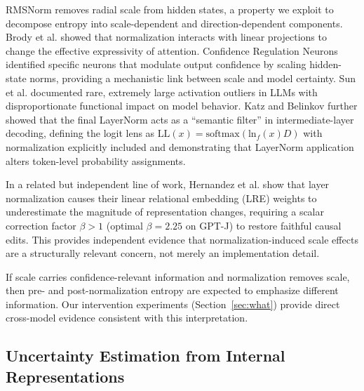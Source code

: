 \documentclass{ieeeaccess}
\begin{document}
RMSNorm \cite{zhang2019rmsnorm} removes radial scale from hidden states, a property we exploit to decompose entropy into scale-dependent and direction-dependent components. Brody et al. \cite{brody2023expressivity} showed that normalization interacts with linear projections to change the effective expressivity of attention. Confidence Regulation Neurons \cite{stolfo2024confidence} identified specific neurons that modulate output confidence by scaling hidden-state norms, providing a mechanistic link between scale and model certainty. Sun et al. \cite{sun2024massive} documented rare, extremely large activation outliers in LLMs with disproportionate functional impact on model behavior. Katz and Belinkov \cite{katz2023visit} further showed that the final LayerNorm acts as a ``semantic filter'' in intermediate-layer decoding, defining the logit lens as $\text{LL}(x) = \text{softmax}(\text{ln}_f(x) D)$ with normalization explicitly included and demonstrating that LayerNorm application alters token-level probability assignments.

In a related but independent line of work, Hernandez et al. \cite{hernandez2024linearity} show that layer normalization causes their linear relational embedding (LRE) weights to underestimate the magnitude of representation changes, requiring a scalar correction factor $\beta > 1$ (optimal $\beta = 2.25$ on GPT-J) to restore faithful causal edits. This provides independent evidence that normalization-induced scale effects are a structurally relevant concern, not merely an implementation detail.

If scale carries confidence-relevant information and normalization removes scale, then pre- and post-normalization entropy are expected to emphasize different information. Our intervention experiments (Section~\ref{sec:what}) provide direct cross-model evidence consistent with this interpretation.

\subsection{Uncertainty Estimation from Internal Representations}
\end{document}
